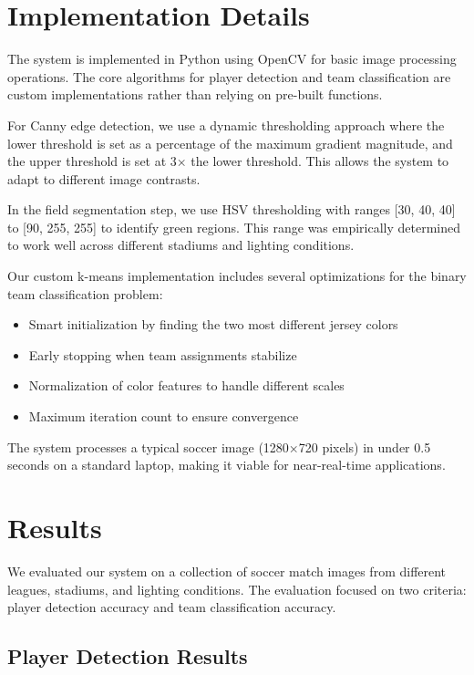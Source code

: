 \documentclass[10pt,twocolumn,letterpaper]{article}
\begin{document}
\section{Implementation Details}
\label{sec:implementation}

The system is implemented in Python using OpenCV for basic image processing operations. The core algorithms for player detection and team classification are custom implementations rather than relying on pre-built functions.

For Canny edge detection, we use a dynamic thresholding approach where the lower threshold is set as a percentage of the maximum gradient magnitude, and the upper threshold is set at 3× the lower threshold. This allows the system to adapt to different image contrasts.

In the field segmentation step, we use HSV thresholding with ranges [30, 40, 40] to [90, 255, 255] to identify green regions. This range was empirically determined to work well across different stadiums and lighting conditions.

Our custom k-means implementation includes several optimizations for the binary team classification problem:
\begin{itemize}
    \item Smart initialization by finding the two most different jersey colors
    \item Early stopping when team assignments stabilize
    \item Normalization of color features to handle different scales
    \item Maximum iteration count to ensure convergence
\end{itemize}

The system processes a typical soccer image (1280×720 pixels) in under 0.5 seconds on a standard laptop, making it viable for near-real-time applications.

\section{Results}
\label{sec:results}

We evaluated our system on a collection of soccer match images from different leagues, stadiums, and lighting conditions. The evaluation focused on two criteria: player detection accuracy and team classification accuracy.

\subsection{Player Detection Results}
\end{document}
